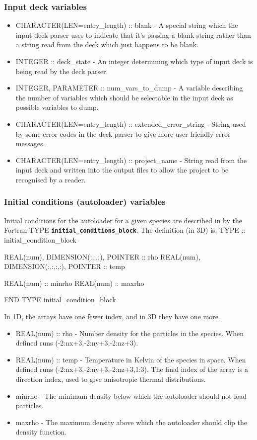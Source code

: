\documentclass[12pt,a4paper]{article}
\newcommand{\inlinecode}[1]{{\color{warwickred} \bf\texttt{#1}}}
\newcommand{\EPOCH}{{\color{warwickdark}\fontfamily{phv}\selectfont{EPOCH}}}
\newenvironment{boxverbatim}{\lboxverbatim{none}}{\endlboxverbatim}
\begin{document}
\subsubsection{Input deck variables}
\begin{itemize}
\item CHARACTER(LEN=entry\_length) :: blank - A special string which the input
  deck parser uses to indicate that it's passing a blank string rather than a
  string read from the deck which just happens to be blank.
\item INTEGER :: deck\_state - An integer determining which type of input deck
  is being read by the deck parser.
\item INTEGER, PARAMETER :: num\_vars\_to\_dump - A variable describing the
  number of variables which should be selectable in the input deck as possible
  variables to dump.
\item CHARACTER(LEN=entry\_length) :: extended\_error\_string - String used by
  some error codes in the deck parser to give more user friendly error
  messages.
\item CHARACTER(LEN=entry\_length) :: project\_name - String read from the
  input deck and written into the output files to allow the project to be
  recognised by a reader.
\end{itemize}

\subsubsection{Initial conditions (autoloader) variables}
Initial conditions for the autoloader for a given species are described in
{\EPOCH} by the Fortran TYPE \inlinecode{initial\_conditions\_block}. The
definition (in 3D) is:
\begin{boxverbatim}
TYPE :: initial_condition_block

  REAL(num), DIMENSION(:,:,:), POINTER :: rho
  REAL(num), DIMENSION(:,:,:,:), POINTER :: temp

  REAL(num) :: minrho
  REAL(num) :: maxrho

END TYPE initial_condition_block
\end{boxverbatim}

In 1D, the arrays have one fewer index, and in 3D they have one more.
\begin{itemize}
\item REAL(num) :: rho - Number density for the particles in the species. When
  defined runs (-2:nx+3,-2:ny+3,-2:nz+3).
\item REAL(num) :: temp - Temperature in Kelvin of the species in space. When
  defined runs (-2:nx+3,-2:ny+3,-2:nz+3,1:3). The final index of the array
  is a direction index, used to give anisotropic thermal distributions.
\item minrho - The minimum density below which the autoloader should not load
  particles.
\item maxrho - The maximum density above which the autoloader should clip the
  density function.
\end{itemize}
\end{document}
